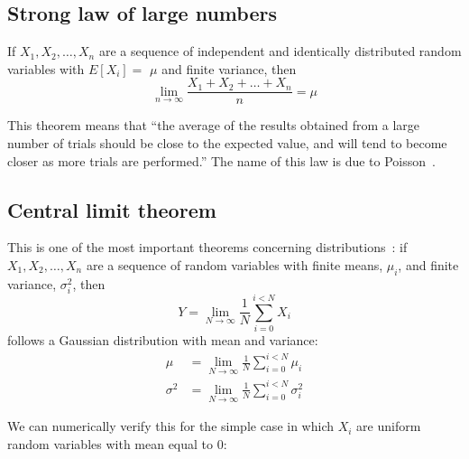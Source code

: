 \documentclass[justified,sixbynine]{tufte-book}
\theoremstyle{plain}%
\theoremstyle{definition}
\theoremstyle{remark}
\begin{document}
\begin{fullwidth}
\goodbreak\subsection{Strong law of large numbers}

If $X_1,X_2,\dots,X_n$ are a sequence of independent and identically
distributed random variables with $E[X_i]=$ $\mu $ and finite variance, then
\begin{equation}
\lim_{n\rightarrow \infty }\frac{X_1+X_2+\dots+X_n}n=\mu
\end{equation}

This theorem means that ``the average of the results obtained from a large number of trials should be close to the expected value, and will tend to become closer as more trials are performed.'' The name of this law is due to Poisson~\cite{largenumbers}.

\goodbreak\subsection{Central limit theorem}

This is one of the most important theorems concerning distributions~\cite{central}:
if $X_1,X_2,\dots,X_n$ are a sequence of random variables with finite means, $\mu_i$, and finite variance, $\sigma^2_i$, then
\begin{equation}
Y = \lim_{N\rightarrow\infty}\frac1N \sum_{i=0}^{i<N} X_i
\end{equation}
follows a Gaussian distribution with mean and variance:
\begin{align}
\mu &= \lim_{N\rightarrow\infty}\frac1N \sum_{i=0}^{i<N} \mu_i \\
\sigma^2 &= \lim_{N\rightarrow\infty}\frac1N \sum_{i=0}^{i<N} \sigma^2_i
\end{align}

We can numerically verify this for the simple case in which $X_i$ are uniform random variables with mean equal to 0:


\end{fullwidth}
\end{document}
